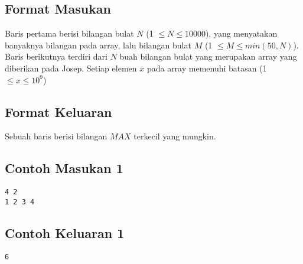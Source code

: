 \documentclass{article}
\begin{document}

\subsection*{Format Masukan}


Baris pertama berisi bilangan bulat $N$ (1 $\leq N \leq 10000$), yang menyatakan banyaknya bilangan pada array, lalu bilangan bulat $M$ (1 $\leq M \leq min(50, N)$).
Baris berikutnya terdiri dari $N$ buah bilangan bulat yang merupakan array yang diberikan pada Josep. Setiap elemen $x$ pada array memenuhi batasan (1 $\leq x \leq 10^9$)

\subsection*{Format Keluaran}
Sebuah baris berisi bilangan $MAX$ terkecil yang mungkin.
\\

\begin{multicols}{2}
\subsection*{Contoh Masukan 1}
\begin{lstlisting}
4 2
1 2 3 4
\end{lstlisting}
\columnbreak
\subsection*{Contoh Keluaran 1}
\begin{lstlisting}
6
\end{lstlisting}
\vfill
\null
\end{multicols}



\pagebreak
\end{document}
